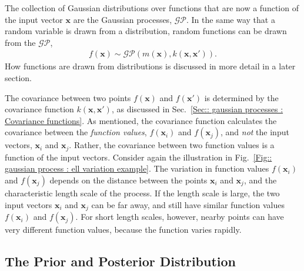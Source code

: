 \documentclass[twoside,english]{uiofysmaster}
\begin{document}
{{The collection of Gaussian distributions over functions that are now a function of the input vector $\textbf{x}$ are the Gaussian processes, $\mathcal{GP}$. In the same way that a random variable is drawn from a distribution, random functions can be drawn from the $\mathcal{GP}$,
\begin{align}
f(\textbf{x}) \sim \mathcal{GP}(m(\textbf{x}), k(\textbf{x}, \textbf{x}')).
\end{align}
How functions are drawn from distributions is discussed in more detail in a later section.

The covariance between two points $f(\textbf{x})$ and $f(\textbf{x}')$ is determined by the covariance function $k(\textbf{x}, \textbf{x}')$, as discussed in Sec.~\ref{Sec:: gaussian processes : Covariance functions}. As mentioned, the covariance function calculates the covariance between the \textit{function values}, $f(\textbf{x}_i)$ and $f(\textbf{x}_j)$, and \textit{not} the input vectors, $\textbf{x}_i$ and $\textbf{x}_j$. Rather, the covariance between two function values is a function of the input vectors. Consider again the illustration in Fig.~\ref{Fig:: gaussian process : ell variation example}. The variation in function values $f(\textbf{x}_i)$ and $f(\textbf{x}_j)$ depends on the distance between the points $\textbf{x}_i$ and $\textbf{x}_j$, and the characteristic length scale of the process. If the length scale is large, the two input vectors $\textbf{x}_i$ and $\textbf{x}_j$ can be far away, and still have similar function values $f(\textbf{x}_i)$ and $f(\textbf{x}_j)$. For short length scales, however, nearby points can have very different function values, because the function varies rapidly.

\subsection{The Prior and Posterior Distribution}\label{Sec:: gaussian process : the prior and posterior distribution}



}}
\end{document}
